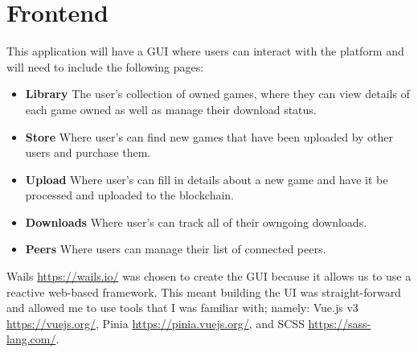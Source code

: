 \section{Frontend}

This application will have a GUI where users can interact with the platform and will need to include the following pages:

\begin{itemize}
  \item \textbf{Library} The user's collection of owned games, where they can view details of each game owned as well as manage their download status.
  \item \textbf{Store} Where user's can find new games that have been uploaded by other users and purchase them.
  \item \textbf{Upload} Where user's can fill in details about a new game and have it be processed and uploaded to the blockchain.
  \item \textbf{Downloads} Where user's can track all of their owngoing downloads.
  \item \textbf{Peers} Where users can manage their list of connected peers.
\end{itemize}

\vspace{2mm}\noindent
Wails \url{https://wails.io/} was chosen to create the GUI because it allows us to use a reactive web-based framework. This meant building the UI was straight-forward and allowed me to use tools that I was familiar with; namely: Vue.js v3 \url{https://vuejs.org/}, Pinia \url{https://pinia.vuejs.org/}, and SCSS \url{https://sass-lang.com/}.